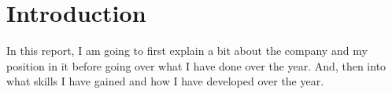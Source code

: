 \section{Introduction}{
	In this report, I am going to first explain a bit about the company and my position in it before going over what I have done over the year. And, then into what skills I have gained and how I have developed over the year.
}